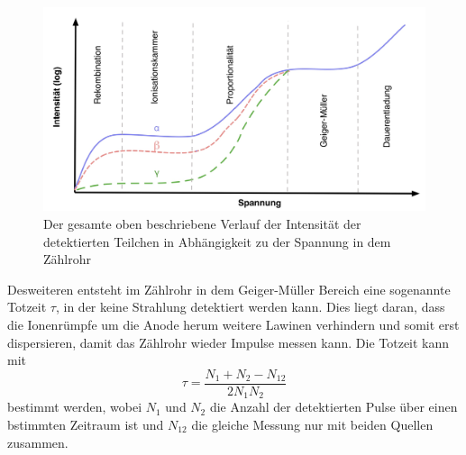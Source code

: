 \begin{figure}[H]
    \includegraphics{Bilder/intensitaetsverlauf.png}
    \caption{Der gesamte oben beschriebene Verlauf der Intensität der detektierten Teilchen in Abhängigkeit zu der Spannung
    in dem Zählrohr}
    \label{fig:intens}
\end{figure}

\noindent Desweiteren entsteht im Zählrohr in dem Geiger-Müller Bereich eine sogenannte Totzeit $\tau$, in der keine
Strahlung detektiert werden kann. Dies liegt daran, dass die Ionenrümpfe um die Anode herum weitere Lawinen verhindern
und somit erst dispersieren, damit das Zählrohr wieder Impulse messen kann. Die Totzeit kann mit
\begin{equation}
    \tau=\frac{N_1+N_2-N_{12}}{2N_1N_2}
    \label{eqn:totzeit}
\end{equation}
bestimmt werden, wobei $N_1$ und $N_2$ die Anzahl der detektierten Pulse über einen bstimmten Zeitraum ist
und $N_{12}$ die gleiche Messung nur mit beiden Quellen zusammen.

\cite{V703}